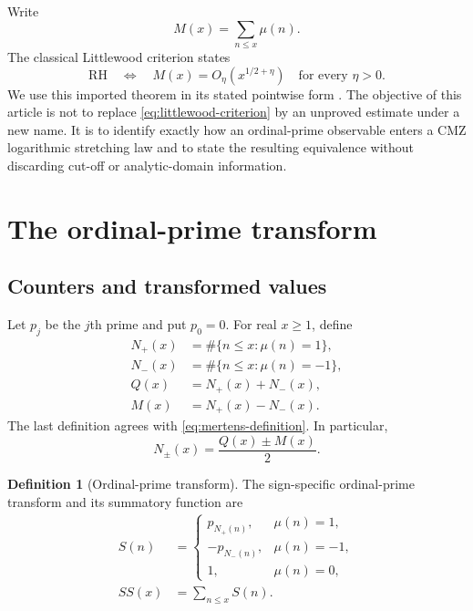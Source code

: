 \documentclass[11pt]{amsart}
\numberwithin{equation}{section}
\theoremstyle{plain}
\theoremstyle{definition}
\newtheorem{definition}[theorem]{Definition}
\theoremstyle{remark}
\newcommand{\RH}{\mathrm{RH}}
\begin{document}
Write
\begin{equation}
M(x)=\sum_{n\le x}\mu(n).
\label{eq:mertens-definition}
\end{equation}
The classical Littlewood criterion states
\begin{equation}
\RH\quad\Longleftrightarrow\quad
M(x)=O_\eta\!\left(x^{1/2+\eta}\right)
\quad\text{for every }\eta>0.
\label{eq:littlewood-criterion}
\end{equation}
We use this imported theorem in its stated pointwise form
\cite{Littlewood1912,Titchmarsh1986}.  The objective of this article is not to
replace \eqref{eq:littlewood-criterion} by an unproved estimate under a new
name.  It is to identify exactly how an ordinal-prime observable enters a CMZ
logarithmic stretching law and to state the resulting equivalence without
discarding cut-off or analytic-domain information.

\section{The ordinal-prime transform}
\label{sec:ordinal-transform}

\subsection{Counters and transformed values}
\label{subsec:counters-transform}

Let $p_j$ be the $j$th prime and put $p_0=0$.  For real $x\ge1$, define
\begin{align}
N_+(x)&=\#\{n\le x:\mu(n)=1\},
\label{eq:Nplus-definition}\\
N_-(x)&=\#\{n\le x:\mu(n)=-1\},
\label{eq:Nminus-definition}\\
Q(x)&=N_+(x)+N_-(x),
\label{eq:Q-definition}\\
M(x)&=N_+(x)-N_-(x).
\label{eq:M-counter-identity}
\end{align}
The last definition agrees with \eqref{eq:mertens-definition}.  In
particular,
\begin{equation}
N_\pm(x)=\frac{Q(x)\pm M(x)}2.
\label{eq:counters-QM}
\end{equation}

\begin{definition}[Ordinal-prime transform]
\label{def:S-transform}
The sign-specific ordinal-prime transform and its summatory function are
\begin{align}
S(n)&=
\begin{cases}
p_{N_+(n)},&\mu(n)=1,\\
-p_{N_-(n)},&\mu(n)=-1,\\
1,&\mu(n)=0,
\end{cases}
\label{eq:S-definition}\\
SS(x)&=\sum_{n\le x}S(n).
\label{eq:SS-definition}
\end{align}
\end{definition}
\end{document}
